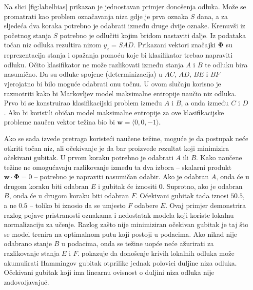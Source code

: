 Na slici \ref{fig:labelbias} prikazan je jednostavan primjer donošenja odluka.
Može se promatrati kao problem označavanja niza gdje je prva oznaka $S$ dana,
a za sljedeća dva koraka potrebno je odabrati između druge dvije oznake.
Krenuvši iz početnog stanja $S$ potrebno je odlučiti kojim bridom nastaviti
dalje. Iz podataka točan niz odluka rezultira nizom $y_z = SAD$. Prikazani
vektori značajki $\mathbf{\Phi}$ su reprezentacija stanja i opažanja pomoću koje
bi klasifikator trebao napraviti odluku. Očito klasifikator ne može razlikovati
između stanja $A$ i $B$ te odluku bira nasumično. Da su odluke spojene
(determinizacija) u $AC$, $AD$, $BE$ i $BF$ vjerojatno bi bilo moguće odabrati
onu točnu. U ovom slučaju korisno je razmotriti kako bi Markovljev model
maksimalne entropije naučio niz odluka. Prvo bi se konstruirao klasifikacijski
problem između $A$ i $B$, a onda između $C$ i $D$. Ako bi koristili običan model
maksimalne entropije za ove klasifikacijske probleme naučen vektor težina bio bi
$\mathbf{w} = \langle 0,0,-1 \rangle$.

Ako se sada izvede pretraga koristeći naučene težine, moguće je da postupak neće
otkriti točan niz, ali očekivanje je da bar proizvede rezultat koji minimizira
očekivani gubitak. U prvom koraku potrebno je odabrati $A$ ili $B$. Kako naučene
težine ne omogućavaju razlikovanje između ta dva izbora -- skalarni produkt
$\mathbf{w} \cdot \mathbf{\Phi} = 0$ -- potrebno je napraviti nasumičan odabir.
Ako je odabran $A$, onda će u drugom koraku biti odabran $E$ i gubitak će
iznositi 0. Suprotno, ako je odabran $B$, onda će u drugom koraku biti odabran
$F$. Očekivani gubitak tada iznosi $50.5$, a ne $0.5$ -- toliko bi iznosio da se
umjesto $F$ odabere $E$. Ovaj primjer demonstrira razlog pojave pristranosti
oznakama i nedostatak modela koji koriste lokalnu normalizaciju za učenje.
Razlog zašto nije minimiziran očekivan gubitak je taj što se model trenira na
optimalnom putu koji postoji u podacima. Ako nikad nije odabrano stanje $B$ u
podacima, onda se težine uopće neće ažurirati za razlikovanje stanja $E$ i $F$.
\citet{kaariainen2006lower} pokazuje da donošenje krivih lokalnih odluka može
akumulirati Hammingov gubitak otprilike jednak polovici duljine niza odluka.
Očekivani gubitak koji ima linearnu ovisnost o duljini niza odluka nije
zadovoljavajuć.

